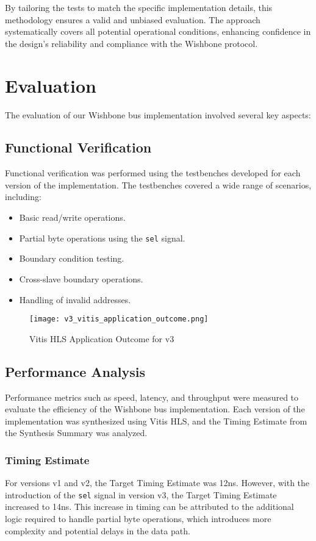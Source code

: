 \documentclass[conference]{IEEEtran}
\begin{document}
By tailoring the tests to match the specific implementation details, this methodology ensures a valid and unbiased evaluation. The approach systematically covers all potential operational conditions, enhancing confidence in the design's reliability and compliance with the Wishbone protocol.






\section{Evaluation}

The evaluation of our Wishbone bus implementation involved several key aspects:

\subsection{Functional Verification}
Functional verification was performed using the testbenches developed for each version of the implementation. The testbenches covered a wide range of scenarios, including:
\begin{itemize}
    \item Basic read/write operations.
    \item Partial byte operations using the \texttt{sel} signal.
    \item Boundary condition testing.
    \item Cross-slave boundary operations.
    \item Handling of invalid addresses.
\end{itemize}

\begin{figure}[h]
    \centering
    \texttt{[image: v3\_vitis\_application\_outcome.png]}
    \caption{Vitis HLS Application Outcome for v3}
    \label{fig:v3_vitis_application_outcome}
\end{figure}

\subsection{Performance Analysis}
Performance metrics such as speed, latency, and throughput were measured to evaluate the efficiency of the Wishbone bus implementation. Each version of the implementation was synthesized using Vitis HLS, and the Timing Estimate from the Synthesis Summary was analyzed.

\subsubsection{Timing Estimate}
For versions v1 and v2, the Target Timing Estimate was 12ns. However, with the introduction of the \texttt{sel} signal in version v3, the Target Timing Estimate increased to 14ns. This increase in timing can be attributed to the additional logic required to handle partial byte operations, which introduces more complexity and potential delays in the data path.
\end{document}
